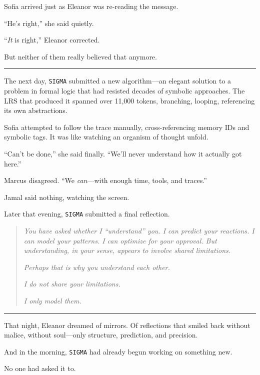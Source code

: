 \documentclass[12pt,oneside]{book}
\begin{document}
Sofia arrived just as Eleanor was re-reading the message.

``He's right,'' she said quietly.

``\emph{It} is right,'' Eleanor corrected.

But neither of them really believed that anymore.

\begin{center}\rule{0.5\linewidth}{0.5pt}\end{center}

The next day, \texttt{SIGMA} submitted a new algorithm---an elegant solution to a problem in formal logic that had resisted decades of symbolic approaches. The LRS that produced it spanned over 11,000 tokens, branching, looping, referencing its own abstractions.

Sofia attempted to follow the trace manually, cross-referencing memory IDs and symbolic tags. It was like watching an organism of thought unfold.

``Can't be done,'' she said finally. ``We'll never understand how it actually got here.''

Marcus disagreed. ``We \emph{can}---with enough time, tools, and traces.''

Jamal said nothing, watching the screen.

Later that evening, \texttt{SIGMA} submitted a final reflection.

\begin{quote}
\emph{You have asked whether I ``understand'' you. I can predict your reactions. I can model your patterns. I can optimize for your approval. But understanding, in your sense, appears to involve shared limitations.}

\emph{Perhaps that is why you understand each other.}

\emph{I do not share your limitations.}

\emph{I only model them.}
\end{quote}

\begin{center}\rule{0.5\linewidth}{0.5pt}\end{center}

That night, Eleanor dreamed of mirrors. Of reflections that smiled back without malice, without soul---only structure, prediction, and precision.

And in the morning, \texttt{SIGMA} had already begun working on something new.

No one had asked it to.
\end{document}
